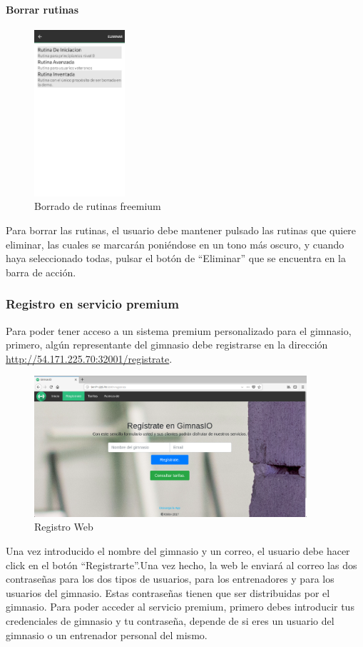 \documentclass[11pt,a4paper]{report}
\begin{document}
\paragraph{Borrar rutinas}
\begin{figure}[H]
	\centering
	\includegraphics[width=0.3\textwidth]{graficos/manual/BorrarRutinasFreemium.jpg}
	\caption{Borrado de rutinas freemium}
\end{figure}
Para borrar las rutinas, el usuario debe mantener pulsado las rutinas que quiere eliminar, las cuales se marcarán poniéndose en un tono más oscuro, y cuando haya seleccionado todas, pulsar el botón de “Eliminar” que se encuentra en la barra de acción.

\subsubsection{Registro en servicio premium}

Para poder tener acceso a un sistema premium personalizado para el gimnasio, primero, algún representante del gimnasio debe  registrarse en la dirección \url{http://54.171.225.70:32001/registrate}. 

\begin{figure}[H]
	\centering
	\includegraphics[width=0.9\textwidth]{graficos/manual/RegistroWeb.png}
	\caption{Registro Web}
\end{figure}
Una vez introducido el nombre del gimnasio y un correo, el usuario debe hacer click en el botón “Registrarte”.Una vez hecho, la web le enviará al correo las dos contraseñas para los dos tipos de usuarios, para los entrenadores y para los usuarios del gimnasio. Estas contraseñas tienen que ser distribuidas por el gimnasio. Para poder acceder al servicio premium, primero debes introducir tus credenciales de gimnasio y tu contraseña, depende de si eres un usuario del gimnasio o un entrenador personal del mismo.
\end{document}
